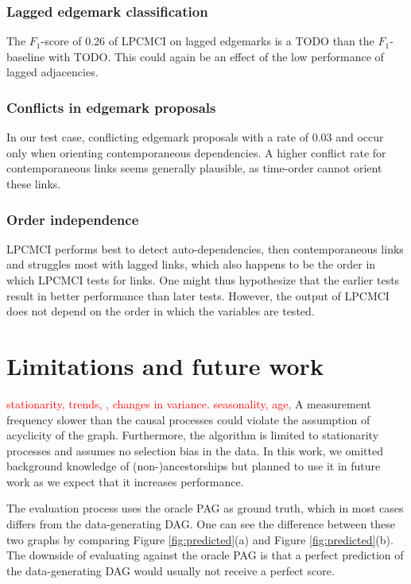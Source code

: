 \documentclass[conference]{IEEEtran}
\begin{document}
\subsubsection{Lagged edgemark classification}
The $F_1$-score of 0.26 of LPCMCI on lagged edgemarks is a TODO than the $F_1$-baseline with TODO.
This could again be an effect of the low performance of lagged adjacencies.

\subsubsection{Conflicts in edgemark proposals}
In our test case, conflicting edgemark proposals with a rate of 0.03 and occur only when orienting contemporaneous dependencies. A higher conflict rate for contemporaneous links seems generally plausible, as time-order cannot orient these links.

\subsubsection{Order independence}
LPCMCI performs best to detect auto-dependencies, then contemporaneous links and struggles most with lagged links, which also happens to be the order in which LPCMCI tests for links. One might thus hypothesize  that the earlier tests result in better performance than later tests. However, the output of LPCMCI does not depend on the order in which the variables are tested\cite{gerhardus_high-recall_2021}.

\section{Limitations and future work}
\textcolor{red}{stationarity, trends, , changes in variance. seasonality, age, }
A measurement frequency slower than the causal processes could violate the assumption of acyclicity of the graph. 
Furthermore, the algorithm is limited to stationarity processes and assumes no selection bias in the data.
In this work, we omitted background knowledge of (non-)ancestorships but planned to use it in future work as we expect that it increases performance.

The evaluation process uses the oracle PAG as ground truth, which in most cases differs from the data-generating DAG. One can see the difference between these two graphs by comparing Figure \ref{fig:predicted}(a) and Figure \ref{fig:predicted}(b). The downside of evaluating against the oracle PAG is that a perfect prediction of the data-generating DAG would usually not receive a perfect score.
\end{document}
